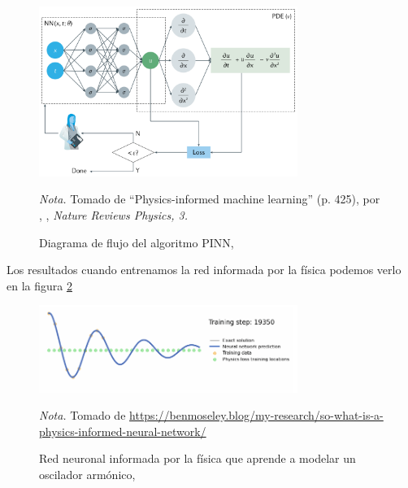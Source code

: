 \begin{figure}[htbp]
    \caption{Diagrama de flujo del algoritmo PINN\sep}
    \label{figure:digrama de flujo PINN}
    \begin{center}
        \includegraphics[width=0.75\textwidth]{img/pinns01.png}
    \end{center}
        \begin{tablenotes}
            \item {{\fontsize{10pt}{ \baselineskip}\selectfont \textit{Nota.} Tomado de ``Physics-informed machine learning'' (p. 425), por \citeauthor{Karniadakis2021}, \citeyear{Karniadakis2021}, \textit{Nature Reviews Physics, 3.} }}
        \end{tablenotes}
\end{figure}
Los resultados cuando entrenamos la red informada por la física podemos verlo en la figura \ref{figure:redNeuronal03}
\begin{figure}[htbp]
    \caption{Red neuronal informada por la física que aprende a modelar un oscilador armónico\sep}
    \label{figure:redNeuronal03}
    \begin{center}
        \includegraphics[width=0.75\textwidth]{img/redNeuronal03.png}
    \end{center}
        \begin{tablenotes}
            \item {{\fontsize{10pt}{ \baselineskip}\selectfont \textit{Nota.} Tomado de \url{https://benmoseley.blog/my-research/so-what-is-a-physics-informed-neural-network/}}}
        \end{tablenotes}
\end{figure}

